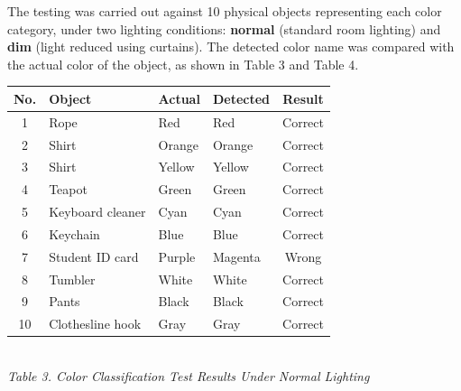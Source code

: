 The testing was carried out against 10 physical objects representing each color category, under two lighting conditions: \textbf{normal} (standard room lighting) and \textbf{dim} (light reduced using curtains). The detected color name was compared with the actual color of the object, as shown in Table 3 and Table 4.

\begin{table}[H]
  \centering
  {\scriptsize
  \begin{tabular}{|c|l|l|l|c|}
    \hline
    \textbf{No.} & \textbf{Object} & \textbf{Actual} & \textbf{Detected} & \textbf{Result} \\
    \hline
    1 & Rope & Red & Red & Correct \\ \hline
    2 & Shirt & Orange & Orange & Correct \\ \hline
    3 & Shirt & Yellow & Yellow & Correct \\ \hline
    4 & Teapot & Green & Green & Correct \\ \hline
    5 & Keyboard cleaner & Cyan & Cyan & Correct \\ \hline
    6 & Keychain & Blue & Blue & Correct \\ \hline
    7 & Student ID card & Purple & Magenta & Wrong \\ \hline
    8 & Tumbler & White & White & Correct \\ \hline
    9 & Pants & Black & Black & Correct \\ \hline
    10 & Clothesline hook & Gray & Gray & Correct \\ \hline
  \end{tabular}}\\[0.3em]
  {\footnotesize\textit{Table 3. Color Classification Test Results Under Normal Lighting}}
\end{table}

